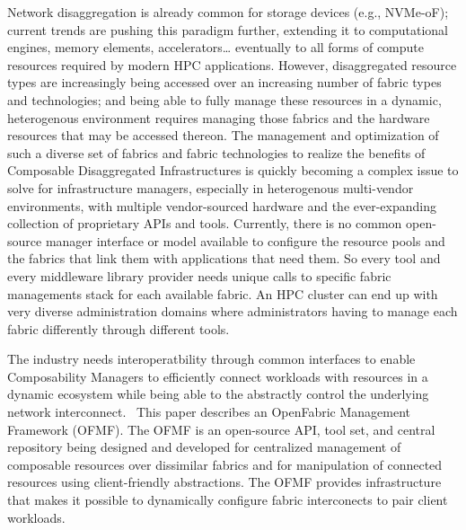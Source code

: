 Network disaggregation is already common for storage devices (e.g., NVMe-oF); current trends are pushing this paradigm further, extending it to computational engines, memory elements, accelerators… eventually to all forms of compute resources required by modern HPC applications.  However, disaggregated resource types are increasingly being accessed over an increasing number of fabric types and technologies; and being able to fully manage these resources in a dynamic, heterogenous environment requires managing those fabrics and the hardware resources that may be accessed thereon. The management and optimization of such a diverse set of fabrics and fabric technologies to realize the benefits of Composable Disaggregated Infrastructures is quickly becoming a complex issue to solve for infrastructure managers, especially in heterogenous multi-vendor environments, with multiple vendor-sourced hardware and the ever-expanding collection of proprietary APIs and tools. Currently, there is no common open-source manager interface or model available to configure the resource pools and the fabrics that link them with applications that need them. So every tool and every middleware library provider needs unique calls to specific fabric managements stack for each available fabric.  An HPC cluster can end up with very diverse administration domains where administrators having to manage each fabric differently through different tools.

The industry needs interoperatbility through common interfaces to enable Composability Managers to efficiently connect workloads with resources in a dynamic ecosystem while being able to the abstractly control the underlying network interconnect.  This paper describes an OpenFabric Management Framework (OFMF).  The OFMF is an open-source API, tool set, and central repository being designed and developed for centralized management of composable resources over dissimilar fabrics and for manipulation of connected resources using client-friendly abstractions.  The OFMF provides infrastructure that makes it possible to dynamically configure fabric interconects to pair client workloads.

  


